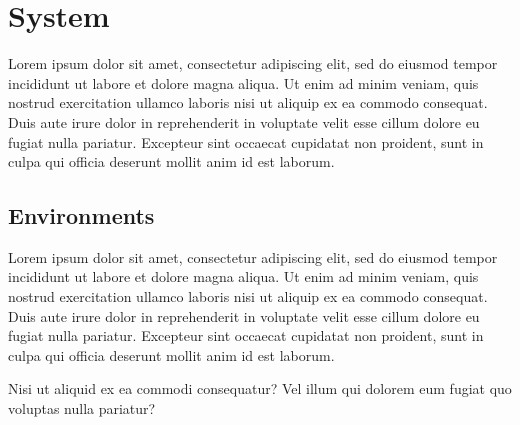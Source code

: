 \section{System}

Lorem ipsum dolor sit amet, consectetur adipiscing elit, sed do eiusmod tempor incididunt ut labore et dolore magna aliqua. Ut enim ad minim veniam, quis nostrud exercitation ullamco laboris nisi ut aliquip ex ea commodo consequat. Duis aute irure dolor in reprehenderit in voluptate velit esse cillum dolore eu fugiat nulla pariatur. Excepteur sint occaecat cupidatat non proident, sunt in culpa qui officia deserunt mollit anim id est laborum.


\subsection{Environments}

Lorem ipsum dolor sit amet, consectetur adipiscing elit, sed do eiusmod tempor incididunt ut labore et dolore magna aliqua. Ut enim ad minim veniam, quis nostrud exercitation ullamco laboris nisi ut aliquip ex ea commodo consequat. Duis aute irure dolor in reprehenderit in voluptate velit esse cillum dolore eu fugiat nulla pariatur. Excepteur sint occaecat cupidatat non proident, sunt in culpa qui officia deserunt mollit anim id est laborum.


\hfill


\hfill


Nisi ut aliquid ex ea commodi consequatur? Vel illum qui dolorem eum fugiat quo voluptas nulla pariatur?



